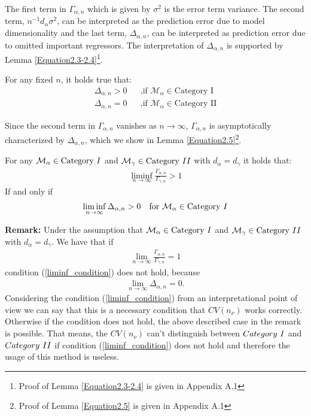 \documentclass[Research_Module_ES.tex]{subfiles}
\begin{document}
 The first term in $\Gamma_{\alpha,n}$ which is given by $\sigma^2$ is the error term variance. The second term, $n^{-1}d_\alpha\sigma^2$, can be interpreted as the prediction error due to model dimensionality and the last term, $\Delta_{\alpha,n}$, can be interpreted as prediction error due to omitted important regressors. The interpretation of $\Delta_{\alpha,n}$ is supported by Lemma \ref{Equation2.3-2.4}\footnote{Proof of Lemma \ref{Equation2.3-2.4} is given in Appendix A.1}.
\begin{lemma}
	\label{Equation2.3-2.4}
	For any fixed $n$, it holds true that:
	\begin{align*}
		&&\Delta_{\alpha,n}>0 &&\text{,if } \mathcal{M}_\alpha\in\text{Category I}&&\\
		&&\Delta_{\alpha,n}=0 &&\text{,if } \mathcal{M}_\alpha\in\text{Category II}&&
	\end{align*}
\end{lemma}
Since the second term in $\Gamma_{\alpha,n}$ vanishes as $n\to\infty$, $\Gamma_{\alpha,n}$ is asymptotically characterized by $\Delta_{\alpha,n}$, which we show in Lemma \ref{Equation2.5}\footnote{Proof of Lemma \ref{Equation2.5} is given in Appendix A.1}. 
\begin{lemma}
	\label{Equation2.5}
	For any $\mathcal{M}_\alpha\in\text{Category}~\RM{1}$ and $\mathcal{M}_\gamma\in\text{Category}~\RM{2}$ with $d_\alpha=d_\gamma$ it holds that:
	\begin{align*}
	\liminf_{n\rightarrow\infty}\frac{\Gamma_{\alpha,n}}{\Gamma_{\gamma,n}}>1
	\end{align*}
	If and only if
	\begin{align}
	\liminf_{n\rightarrow\infty}\Delta_{\alpha,n}>0 \text{~~~for~}\mathcal{M}_\alpha\in\text{Category}~\RM{1} \label{liminf_condition}
	\end{align}
\end{lemma}

\textbf{Remark:}
	Under the assumption that $\mathcal{M}_\alpha\in\text{Category}~\RM{1}$ and $\mathcal{M}_\gamma\in\text{Category}~\RM{2}$ with $d_\alpha=d_\gamma$. We have that if
	\begin{align*}
		\lim_{n\rightarrow\infty}\frac{\Gamma_{\alpha,n}}{\Gamma_{\gamma,n}}=1
	\end{align*} 
	condition (\ref{liminf_condition}) does not hold, because
	\begin{align*}
	\lim_{n\rightarrow\infty}\Delta_{\alpha,n}=0.
	\end{align*}
Considering the condition (\ref{liminf_condition}) from an interpretational point of view we can say that
this is a necessary condition that $CV(n_\nu)$ works correctly. Otherwise if the condition does not hold, the above described case in the remark is possible. That means, the $CV(n_\nu)$ can't distinguish between $Category~\RM{1}$ and $Category~\RM{2}$ if condition (\ref{liminf_condition}) does not hold and therefore the usage of this method is useless.
\end{document}
